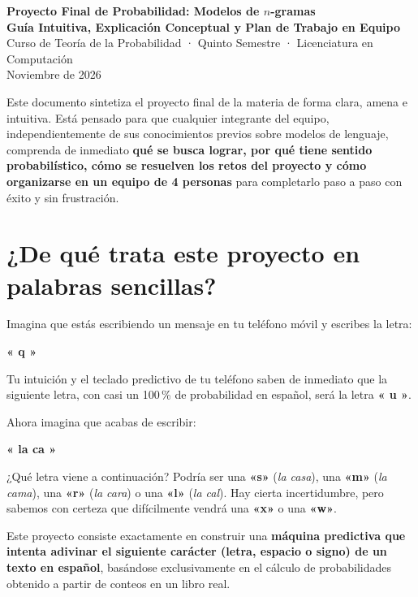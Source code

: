 \documentclass[11pt,letterpaper]{article}
\begin{document}
\begin{center}
  {\LARGE \textbf{\textcolor{primary}{Proyecto Final de Probabilidad: Modelos de $n$-gramas}}}\\[0.25em]
  {\Large \textbf{Guía Intuitiva, Explicación Conceptual y Plan de Trabajo en Equipo}}\\[0.25em]
  {\normalsize Curso de Teoría de la Probabilidad · Quinto Semestre · Licenciatura en Computación}\\[0.15em]
  {\small Noviembre de 2026}
\end{center}
\vspace{-0.5em}

\begin{infobox}[title=Propósito de esta guía]
Este documento sintetiza el proyecto final de la materia de forma clara, amena e intuitiva. Está pensado para que cualquier integrante del equipo, independientemente de sus conocimientos previos sobre modelos de lenguaje, comprenda de inmediato \textbf{qué se busca lograr, por qué tiene sentido probabilístico, cómo se resuelven los retos del proyecto y cómo organizarse en un equipo de 4 personas} para completarlo paso a paso con éxito y sin frustración.
\end{infobox}

\section{¿De qué trata este proyecto en palabras sencillas?}

Imagina que estás escribiendo un mensaje en tu teléfono móvil y escribes la letra:
\begin{center}
\textbf{\Large « q »}
\end{center}
Tu intuición y el teclado predictivo de tu teléfono saben de inmediato que la siguiente letra, con casi un 100\,\% de probabilidad en español, será la letra \textbf{« u »}.

Ahora imagina que acabas de escribir:
\begin{center}
\textbf{\Large « la ca »}
\end{center}
¿Qué letra viene a continuación? Podría ser una \textbf{«s»} (\textit{la casa}), una \textbf{«m»} (\textit{la cama}), una \textbf{«r»} (\textit{la cara}) o una \textbf{«l»} (\textit{la cal}). Hay cierta incertidumbre, pero sabemos con certeza que difícilmente vendrá una \textbf{«x»} o una \textbf{«w»}.

Este proyecto consiste exactamente en construir una \textbf{máquina predictiva que intenta adivinar el siguiente carácter (letra, espacio o signo) de un texto en español}, basándose exclusivamente en el cálculo de probabilidades obtenido a partir de conteos en un libro real.
\end{document}
